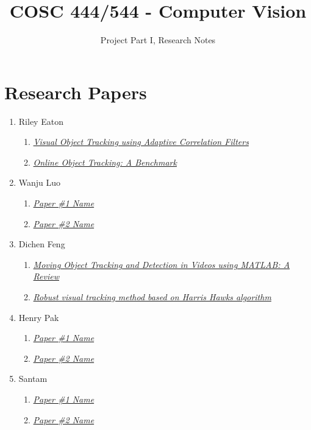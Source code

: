 \documentclass{article}
\title{COSC 444/544 - Computer Vision}
\author{Project Part I, Research Notes}
\begin{document}
\maketitle

\section*{Research Papers}

\begin{enumerate}
\item Riley Eaton
  \begin{enumerate}[label*=\arabic*.]
  \item \textit{\href{https://typeset.io/papers/visual-object-tracking-using-adaptive-correlation-filters-1xuhtpe358}{Visual Object Tracking using Adaptive Correlation Filters}}
  \item \textit{\href{https://faculty.ucmerced.edu/mhyang/papers/cvpr13_benchmark.pdf}{Online Object Tracking: A Benchmark}}
  \end{enumerate}
\item Wanju Luo
  \begin{enumerate}[label*=\arabic*.]
  \item \textit{\href{paper_link_here}{Paper \#1 Name}}
  \item \textit{\href{paper_link_here}{Paper \#2 Name}}
  \end{enumerate}
\item Dichen Feng
  \begin{enumerate}[label*=\arabic*.]
  \item \textit{\href{https://jst.org.in/index.php/pub/article/view/743/669}{Moving Object Tracking and Detection in Videos using MATLAB: A Review}}
  \item \textit{\href{https://www.semanticscholar.org/paper/Robust-visual-tracking-method-based-on-Harris-Hawks-Charef-Khodja-Abida/e945f79be12f7d64df3d5ef69256e2a0eaec1f03}{Robust visual tracking method based on Harris Hawks algorithm}}
  \end{enumerate}
\item Henry Pak
  \begin{enumerate}[label*=\arabic*.]
  \item \textit{\href{paper_link_here}{Paper \#1 Name}}
  \item \textit{\href{paper_link_here}{Paper \#2 Name}}
  \end{enumerate}
\item Santam
  \begin{enumerate}[label*=\arabic*.]
  \item \textit{\href{paper_link_here}{Paper \#1 Name}}
  \item \textit{\href{paper_link_here}{Paper \#2 Name}}
  \end{enumerate}
\end{enumerate}
\end{document}
